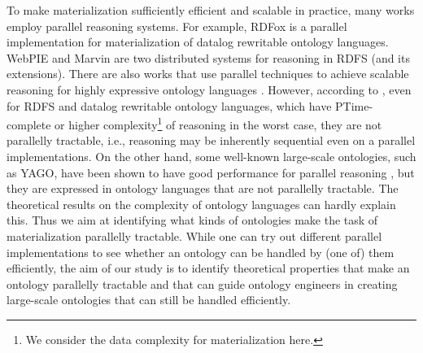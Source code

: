 \documentclass{article}
\begin{document}
To make materialization sufficiently efficient and scalable in practice, many works employ parallel reasoning systems. For example, RDFox \cite{DBLP:conf/aaai/MotikNPHO14} is a parallel implementation for materialization of datalog rewritable ontology languages. WebPIE \cite{DBLP:journals/ws/UrbaniKMHB12} and Marvin \cite{oren2009marvin} are two distributed systems for reasoning in RDFS (and its extensions). There are also works that use parallel techniques to achieve scalable reasoning for highly expressive ontology languages \cite{DBLP:conf/dlog/SchlichtS08,DBLP:conf/dlog/WuH12}. However, according to \citeauthor{RAYMOND-GREENLAW} , even for RDFS and datalog rewritable ontology languages, which have PTime-complete or higher complexity\footnote{We consider the data complexity for materialization here.} of reasoning in the worst case, they are not parallelly tractable, i.e., reasoning may be inherently sequential even on a parallel implementations. On the other hand, some well-known large-scale ontologies, such as YAGO, have been shown to have good performance for parallel reasoning \cite{DBLP:conf/icde/SundaraAKDWCS10}, but they are expressed in ontology languages that are not parallelly tractable. The theoretical results on the complexity of ontology languages can hardly explain this. Thus %
we aim at identifying what kinds of ontologies make the task of materialization parallelly tractable. While one can try out different parallel implementations to see whether an ontology can be handled by (one of) them efficiently, the aim of our study is to identify theoretical properties that make an ontology parallelly tractable and that can guide ontology engineers in creating large-scale ontologies that can still be handled efficiently. 
\end{document}

